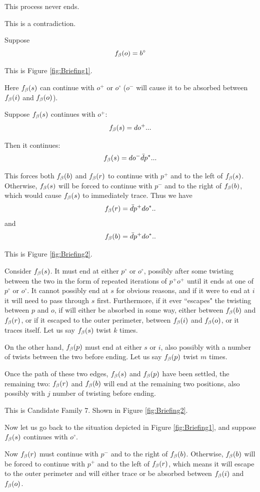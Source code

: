 This process never ends.

This is a contradiction.


\label{Briefing}
Suppose 
\[
f_\beta(o) = b^\circ
\]

This is Figure \ref{fig:Briefing1}.

Here $f_\beta(s)$ can continue with $o^+$ or $o^\circ$ ($o^-$ will cause it to be absorbed between $f_\beta(i)$ and $f_\beta(o)$).

Suppose $f_\beta(s)$ continues with $o^+$:
\[
f_\beta(s) = d o^+...
\]

Then it continues:
\[
f_\beta(s) = d o^- \bar{d} p^*...
\]

This forces both $f_\beta(b)$ and $f_\beta(r)$ to continue with $p^+$ and to the left of $f_\beta(s)$. Otherwise, $f_\beta(s)$ will be forced to continue with $p^-$ and to the right of $f_\beta(b)$, which would cause $f_\beta(s)$ to immediately trace. Thus we have
\[
f_\beta(r) = \bar{d} p^+ d o^*..
\]
and
\[
f_\beta(b) = \bar{d} p^+ d o^*..
\]

This is Figure \ref{fig:Briefing2}.

Consider $f_\beta(s)$. It must end at either $p^\circ$ or $o^\circ$, possibly after some twisting between the two in the form of repeated iterations of $p^+ o^+$ until it ends at one of $p^\circ$ or $o^\circ$. It cannot possibly end at $s$ for obvious reasons, and if it were to end at $i$ it will need to pass through $s$ first. Furthermore, if it ever ``escapes" the twisting between $p$ and $o$, if will either be absorbed in some way, either between $f_\beta(b)$ and $f_\beta(r)$, or if it escaped to the outer perimeter, between $f_\beta(i)$ and $f_\beta(o)$, or it traces itself. Let us say $f_\beta(s)$ twist $k$ times.

On the other hand, $f_\beta(p)$ must end at either $s$ or $i$, also possibly with a number of twists between the two before ending. Let us say $f_\beta(p)$ twist $m$ times.

Once the path of these two edges, $f_\beta(s)$ and $f_\beta(p)$ have been settled, the remaining two: $f_\beta(r)$ and $f_\beta(b)$ will end at the remaining two positions, also possibly with $j$ number of twisting before ending.


This is Candidate Family 7. Shown in Figure \ref{fig:Briefing2}.

Now let us go back to the situation depicted in Figure \ref{fig:Briefing1}, and suppose $f_\beta(s)$ continues with $o^\circ$. 

Now $f_\beta(r)$ must continue with $p^-$ and to the right of $f_\beta(b)$. Otherwise, $f_\beta(b)$ will be forced to continue with $p^+$ and to the left of $f_\beta(r)$, which means it will escape to the outer perimeter and will either trace or be absorbed between $f_\beta(i)$ and $f_\beta(o)$.

